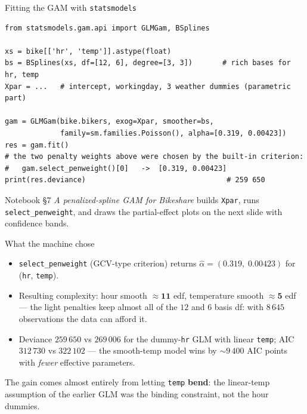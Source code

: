 \documentclass[aspectratio=169,11pt]{beamer}
\begin{document}
\begin{frame}[fragile]{Fitting the GAM with \texttt{statsmodels}}
\begin{lstlisting}
from statsmodels.gam.api import GLMGam, BSplines

xs = bike[['hr', 'temp']].astype(float)
bs = BSplines(xs, df=[12, 6], degree=[3, 3])       # rich bases for hr, temp
Xpar = ...   # intercept, workingday, 3 weather dummies (parametric part)

gam = GLMGam(bike.bikers, exog=Xpar, smoother=bs,
             family=sm.families.Poisson(), alpha=[0.319, 0.00423])
res = gam.fit()
# the two penalty weights above were chosen by the built-in criterion:
#   gam.select_penweight()[0]   ->  [0.319, 0.00423]
print(res.deviance)                                 # 259 650
\end{lstlisting}
  \begin{labnote}
    Notebook \S 7 \emph{A penalized-spline GAM for Bikeshare} builds \texttt{Xpar},
    runs \texttt{select\_penweight}, and draws the partial-effect plots on the next
    slide with confidence bands.
  \end{labnote}
\end{frame}

\begin{frame}{What the machine chose}
  \begin{numexample}
    \begin{itemize}
      \item \texttt{select\_penweight} (GCV-type criterion) returns
            $\hat\alpha = (0.319,\; 0.00423)$ for (\texttt{hr}, \texttt{temp}).
      \item Resulting complexity: hour smooth $\approx \mathbf{11}$ edf, temperature
            smooth $\approx \mathbf{5}$ edf --- the light penalties keep almost all of
            the $12$ and $6$ basis df: with $8\,645$ observations the data can afford it.
      \item Deviance $259\,650$ vs $269\,006$ for the dummy-\texttt{hr} GLM with linear
            \texttt{temp}; AIC $312\,730$ vs $322\,102$ --- the smooth-temp model wins
            by $\sim\!9\,400$ AIC points with \emph{fewer} effective parameters.
    \end{itemize}
  \end{numexample}
  \begin{takeaway}
    The gain comes almost entirely from letting \texttt{temp} \textbf{bend}: the
    linear-temp assumption of the earlier GLM was the binding constraint, not the
    hour dummies.
  \end{takeaway}
\end{frame}
\end{document}
